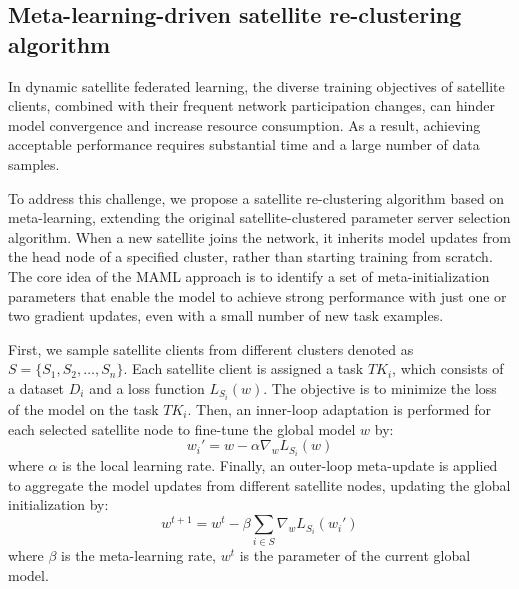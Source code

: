 \subsection{Meta-learning-driven satellite re-clustering algorithm}

In dynamic satellite federated learning, the diverse training objectives of satellite clients, combined with their frequent network participation changes, can hinder model convergence and increase resource consumption. As a result, achieving acceptable performance requires substantial time and a large number of data samples.

To address this challenge, we propose a satellite re-clustering algorithm based on meta-learning, extending the original satellite-clustered parameter server selection algorithm. When a new satellite joins the network, it inherits model updates from the head node of a specified cluster, rather than starting training from scratch. The core idea of the MAML approach is to identify a set of meta-initialization parameters that enable the model to achieve strong performance with just one or two gradient updates, even with a small number of new task examples.

First, we sample satellite clients from different clusters denoted as $ S = \{S_1, S_2, \dots, S_n\} $. Each satellite client is assigned a task $\textit{TK}_i$, which consists of a dataset $D_i$  and a loss function $L_{S_i}(w)$. The objective is to minimize the loss of the model on the task $\textit{TK}_i$. Then, an inner-loop adaptation is performed for each selected satellite node to fine-tune the global model $w$ by:
\begin{equation}
w_i' = w - \alpha \nabla_{w} L_{S_i}(w)
\end{equation}
where $\alpha$ is the local learning rate. Finally, an outer-loop meta-update is applied to aggregate the model updates from different satellite nodes, updating the global initialization by:
\begin{equation}
w^{t+1} = w^{t} - \beta \sum_{i \in S} \nabla_{w} L_{S_i}(w_i')
\end{equation}
where $\beta$ is the meta-learning rate, $w^{t}$ is the parameter of the current global model.

